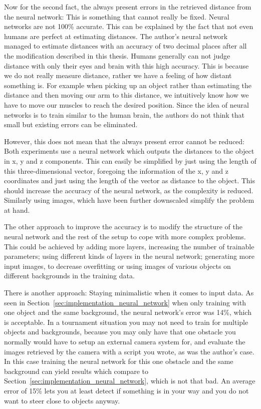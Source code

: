 Now for the second fact, the always present errors in the retrieved distance from the neural network: This is something that cannot really be fixed. Neural networks are not 100\% accurate. This can be explained by the fact that not even humans are perfect at estimating distances. The author's neural network managed to estimate distances with an accuracy of two decimal places after all the modification described in this thesis. Humans generally can not judge distance with only their eyes and brain with this high accuracy. This is because we do not really measure distance, rather we have a feeling of how distant something is. For example when picking up an object rather than estimating the distance and then moving our arm to this distance, we intuitively know how we have to move our muscles to reach the desired position. Since the idea of neural networks is to train similar to the human brain, the authors do not think that small but existing errors can be eliminated. 

However, this does not mean that the always present error cannot be reduced: Both experiments use a neural network which outputs the distances to the object in x, y and z components. This can easily be simplified by just using the length of this three-dimensional vector, foregoing the information of the x, y and z coordinates and just using the length of the vector as distance to the object. This should increase the accuracy of the neural network, as the complexity is reduced. Similarly using images, which have been further downscaled simplify the problem at hand.

The other approach to improve the accuracy is to modify the structure of the neural network and the rest of the setup to cope with more complex problems. This could be achieved by adding more layers, increasing the number of trainable parameters; using different kinds of layers in the neural network; generating more input images, to decrease overfitting or using images of various objects on different backgrounds in the training data.

There is another approach: Staying minimalistic when it comes to input data. As seen in Section~\ref{sec:implementation_neural_network} when only training with one object and the same background, the neural network's error was 14\%, which is acceptable. In a tournament situation you may not need to train for multiple objects and backgrounds, because you may only have that one obstacle you normally would have to setup an external camera system for, and evaluate the images retrieved by the camera with a script you wrote, as was the author's case. In this case training the neural network for this one obstacle and the same background can yield results which compare to Section~\ref{sec:implementation_neural_network}, which is not that bad. An average error of 15\% lets you at least detect if something is in your way and you do not want to steer close to objects anyway.

